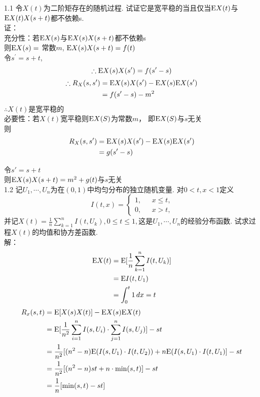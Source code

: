 

1.1 令$X(t)$为二阶矩存在的随机过程. 试证它是宽平稳的当且仅当$\mathrm{E} X(t)$与$\mathrm{E} X(t)X(s+t)$都不依赖s.\\
证：\\
充分性：若$\mathrm{E} X(s)$与$\mathrm{E} X(s)X(s+t)$都不依赖s\\
        则$\mathrm{E} X(s) = $ 常数$m$, $\mathrm{E} X(s)X(s+t) = f(t)$\\
        令$s^{\prime} = s + t$,\\
        \[
        \therefore \mathrm{E} X(s)X(s^{\prime}) = f(s^{\prime}-s)
        \]
		\[			
			\begin{aligned}
			\therefore R_X(s, s^{\prime})  & = \mathrm{E} X(s)X(s^{\prime}) - \mathrm{E} X(s)\mathrm{E} X(s^{\prime}) \\
									 & = f(s^{\prime} - s) - m^2 
			\end{aligned}
		\]
		$\therefore X(t)$是宽平稳的\\
必要性：若$X(t)$宽平稳则$\mathrm{E} X(S)$为常数$m$， 即$\mathrm{E} X(S)$与$s$无关\\
				则
			\[
			\begin{aligned}
			 R_X(s, s^{\prime}) & = \mathrm{E} X(s)X(s^{\prime}) - \mathrm{E} X(s)\mathrm{E} X(s^{\prime}) \\
									& = g(s^{\prime} - s) \\
			\end{aligned}
			\]

			令$s' = s + t$ \\
			则$\mathrm{E} X(s)X(s+t) = m^2 + g(t)$与$s$无关\\


1.2 记$U_1, \cdots, U_n$为在$(0,1)$中均匀分布的独立随机变量. 对$0<t,x<1$定义
	\[ I(t,x) = 
		\begin{cases}
		1, & \text{ $x \leqslant t$,} \\
		0, & \text{ $x > t$,}
		\end{cases}
	\]
并记$X(t) = \frac{1}{n}\sum\limits^n_{k=1}I(t,U_k), 0 \leqslant t \leqslant 1, $这是$U_1, \cdots, U_n$的经验分布函数. 试求过程$X(t)$的均值和协方差函数.\\
解：
	\[
	\begin{aligned}
	\mathrm{E} X(t) & = \mathrm{E} [\frac{1}{n}\sum^n_{k=1}I(t, U_k)] \\
		& = \mathrm{E} I(t, U_1) \\
		& = \int^t_0 1\,dx = t \\
	\end{aligned}
	\]
	\[
	\begin{aligned}
	R_x(s, t) & = \mathrm{E} [X(s)X(t)] - \mathrm{E} X(s)\mathrm{E} X(t)\\
			& = \mathrm{E} [\frac{1}{n^2}\sum^n_{i=1}I(s, U_i) \cdot \sum^n_{j=1}I(s, U_j)] - st\\
			& = \frac{1}{n^2}[(n^2 - n)\mathrm{E} (I(s, U_1) \cdot I(t, U_2)) + n\mathrm{E} (I(s, U_1) \cdot I(t, U_1)] - st\\
			& = \frac{1}{n^2}[(n^2 - n)st + n \cdot \min(s, t)] - st\\
			& = \frac{1}{n}[\min(s, t) - st]
	\end{aligned}
	\]\\


